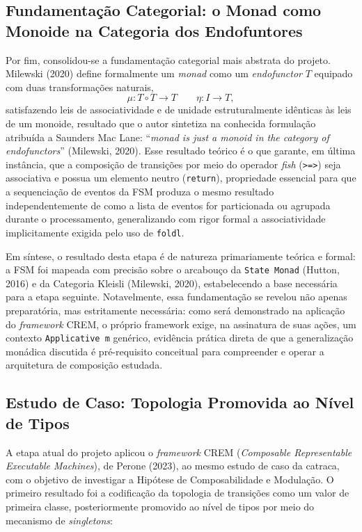 \documentclass[12pt,a4paper]{article}
\begin{document}
\subsection{Fundamentação Categorial: o Monad como Monoide na Categoria dos Endofuntores}

Por fim, consolidou-se a fundamentação categorial mais abstrata do projeto. Milewski (2020) define formalmente um \textit{monad} como um \textit{endofunctor} $T$ equipado com duas transformações naturais,
$$\mu : T \circ T \to T \qquad \eta : I \to T,$$
satisfazendo leis de associatividade e de unidade estruturalmente idênticas às leis de um monoide, resultado que o autor sintetiza na conhecida formulação atribuída a Saunders Mac Lane: ``\textit{monad is just a monoid in the category of endofunctors}'' (Milewski, 2020). Esse resultado teórico é o que garante, em última instância, que a composição de transições por meio do operador \textit{fish} (\texttt{>=>}) seja associativa e possua um elemento neutro (\texttt{return}), propriedade essencial para que a sequenciação de eventos da FSM produza o mesmo resultado independentemente de como a lista de eventos for particionada ou agrupada durante o processamento, generalizando com rigor formal a associatividade implicitamente exigida pelo uso de \texttt{foldl}.

Em síntese, o resultado desta etapa é de natureza primariamente teórica e formal: a FSM foi mapeada com precisão sobre o arcabouço da \texttt{State Monad} (Hutton, 2016) e da Categoria Kleisli (Milewski, 2020), estabelecendo a base necessária para a etapa seguinte. Notavelmente, essa fundamentação se revelou não apenas preparatória, mas estritamente necessária: como será demonstrado na aplicação do \textit{framework} CREM, o próprio framework exige, na assinatura de suas ações, um contexto \texttt{Applicative m} genérico, evidência prática direta de que a generalização monádica discutida é pré-requisito conceitual para compreender e operar a arquitetura de composição estudada.

\subsection{Estudo de Caso: Topologia Promovida ao Nível de Tipos}

A etapa atual do projeto aplicou o \textit{framework} CREM (\textit{Composable Representable Executable Machines}), de Perone (2023), ao mesmo estudo de caso da catraca, com o objetivo de investigar a Hipótese de Composabilidade e Modulação. O primeiro resultado foi a codificação da topologia de transições como um valor de primeira classe, posteriormente promovido ao nível de tipos por meio do mecanismo de \textit{singletons}:
\end{document}
